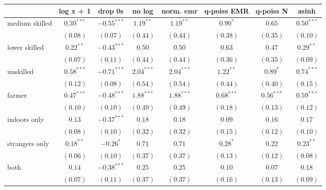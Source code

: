 
\begin{table}
\begin{center}
\begin{tabular}{l c c c c c c c}
\hline
 & log x + 1 & drop 0s & no log & norm. emr & q-poiss EMR & q-poiss N  & asinh \\
\hline
medium skilled & $0.39^{***}$  & $-0.55^{***}$ & $1.19^{**}$   & $1.19^{**}$   & $0.90^{*}$    & $0.65$        & $0.50^{***}$  \\
               & $(0.08)$      & $(0.07)$      & $(0.44)$      & $(0.44)$      & $(0.38)$      & $(0.35)$      & $(0.10)$      \\
lower skilled  & $0.22^{**}$   & $-0.43^{***}$ & $0.50$        & $0.50$        & $0.63$        & $0.47$        & $0.29^{**}$   \\
               & $(0.07)$      & $(0.11)$      & $(0.44)$      & $(0.44)$      & $(0.36)$      & $(0.35)$      & $(0.09)$      \\
unskilled      & $0.58^{***}$  & $-0.71^{***}$ & $2.04^{***}$  & $2.04^{***}$  & $1.22^{**}$   & $0.89^{*}$    & $0.74^{***}$  \\
               & $(0.12)$      & $(0.08)$      & $(0.54)$      & $(0.54)$      & $(0.44)$      & $(0.40)$      & $(0.15)$      \\
farmer         & $0.47^{***}$  & $-0.48^{***}$ & $1.88^{***}$  & $1.88^{***}$  & $0.68^{***}$  & $0.56^{***}$  & $0.59^{***}$  \\
               & $(0.10)$      & $(0.10)$      & $(0.49)$      & $(0.49)$      & $(0.18)$      & $(0.13)$      & $(0.12)$      \\
indoors only   & $0.13$        & $-0.37^{***}$ & $0.18$        & $0.18$        & $0.09$        & $0.16$        & $0.17$        \\
               & $(0.08)$      & $(0.10)$      & $(0.32)$      & $(0.32)$      & $(0.15)$      & $(0.12)$      & $(0.10)$      \\
strangers only & $0.18^{**}$   & $-0.26^{*}$   & $0.71$        & $0.71$        & $0.28^{*}$    & $0.22$        & $0.23^{**}$   \\
               & $(0.06)$      & $(0.10)$      & $(0.37)$      & $(0.37)$      & $(0.13)$      & $(0.12)$      & $(0.08)$      \\
both           & $0.14$        & $-0.38^{***}$ & $0.25$        & $0.25$        & $0.10$        & $0.07$        & $0.18$        \\
               & $(0.07)$      & $(0.11)$      & $(0.37)$      & $(0.37)$      & $(0.16)$      & $(0.13)$      & $(0.09)$      \\

\end{tabular}
\end{center}
\end{table}

